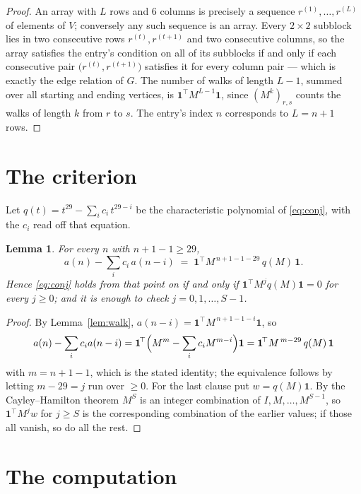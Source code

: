 \documentclass[11pt,a4paper]{article}
\theoremstyle{plain}
\newtheorem{lemma}[theorem]{Lemma}
\theoremstyle{definition}
\begin{document}
\begin{proof}
An array with $L$ rows and $6$ columns is precisely a sequence
$r^{(1)},\dots,r^{(L)}$ of elements of $V$; conversely any such sequence is an array.
Every $2\times2$ subblock lies in two consecutive rows $r^{(t)},r^{(t+1)}$ and two
consecutive columns, so the array satisfies the entry's condition on all of its subblocks
if and only if each consecutive pair $\bigl(r^{(t)},r^{(t+1)}\bigr)$ satisfies it for
every column pair --- which is exactly the edge relation of $G$. The number of walks of
length $L-1$, summed over all starting and ending vertices, is
$\mathbf{1}^{\!\top}M^{L-1}\mathbf{1}$, since $(M^{k})_{r,s}$ counts the walks of
length $k$ from $r$ to $s$. The entry's index $n$ corresponds to $L=n+1$ rows.
\end{proof}

\section{The criterion}

Let $q(t)=t^{29}-\sum_i c_i\,t^{29-i}$ be the characteristic polynomial of
\eqref{eq:conj}, with the $c_i$ read off that equation.

\begin{lemma}\label{lem:crit}
For every $n$ with $n+1-1\ge29$,
\[
a(n)-\sum_i c_i\,a(n-i)\;=\;\mathbf{1}^{\!\top}M^{\,n+1-1-29}\,q(M)\,\mathbf{1} .
\]
Hence \eqref{eq:conj} holds from that point on if and only if
$\mathbf{1}^{\!\top}M^{j}q(M)\mathbf{1}=0$ for every $j\ge0$; and it is enough to check
$j=0,1,\dots,S-1$.
\end{lemma}

\begin{proof}
By Lemma~\ref{lem:walk}, $a(n-i)=\mathbf{1}^{\!\top}M^{\,n+1-1-i}\mathbf{1}$, so
\[
a(n)-\sum_i c_i a(n-i)
=\mathbf{1}^{\!\top}\Bigl(M^{m}-\sum_i c_i M^{m-i}\Bigr)\mathbf{1}
=\mathbf{1}^{\!\top}M^{\,m-29}\,q(M)\,\mathbf{1}
\]
with $m=n+1-1$, which is the stated identity; the equivalence follows by letting
$m-29=j$ run over $\ge0$. For the last clause put $w=q(M)\mathbf{1}$. By the
Cayley--Hamilton theorem $M^{S}$ is an integer combination of $I,M,\dots,M^{S-1}$, so
$\mathbf{1}^{\!\top}M^{j}w$ for $j\ge S$ is the corresponding combination of the earlier
values; if those all vanish, so do all the rest.
\end{proof}

\section{The computation}
\end{document}
